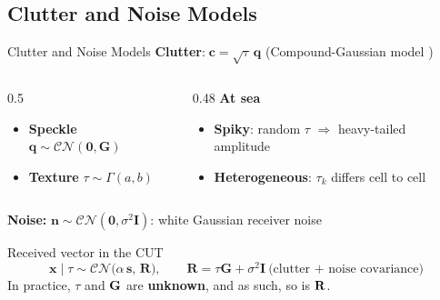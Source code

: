 \documentclass{beamer}
\begin{document}
\subsection{Clutter and Noise Models}
\begin{frame}{Clutter and Noise Models}
    \small
    \textbf{Clutter}:$\;\mathbf{c} = \sqrt{\tau}\,\mathbf{q}$ (Compound-Gaussian model \cite{Gini1998})
    \vspace{1mm}
    \begin{columns}[T]
        \begin{column}{0.5\textwidth}
            \begin{itemize}
                \item \textbf{Speckle} $\mathbf{q}\sim\mathcal{CN}(\mathbf{0},\mathbf{G})$
                \item \textbf{Texture} $\tau\sim\Gamma(a, b)$
            \end{itemize}
        \end{column}
        \begin{column}{0.48\textwidth}
            \textbf{At sea}
            \begin{itemize}
                \item \textbf{Spiky}: random $\tau$ $\Rightarrow$ heavy-tailed amplitude
                \item \textbf{Heterogeneous}: $\tau_k$ differs cell to cell
            \end{itemize}
        \end{column}
    \end{columns}
    \vspace{8mm}
    \textbf{Noise:} $\mathbf{n}\sim\mathcal{CN}(\mathbf{0},\sigma^2\mathbf{I})$: white Gaussian receiver noise
    \begin{block}{Received vector in the CUT}
        \[ \mathbf{x}\mid\tau \sim \mathcal{CN}\big(\alpha\,\mathbf{s},\, \mathbf{R}\big), \qquad
           \mathbf{R} = \tau\mathbf{G} + \sigma^2\mathbf{I}\ \text{(clutter + noise covariance)} \]
        In practice, $\tau$ and $\mathbf{G}$ are \textbf{unknown}, and as such, so is $\mathbf{R}$.
    \end{block}
\end{frame}

\end{document}
